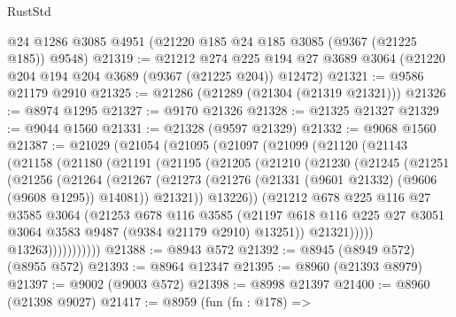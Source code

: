\begin{lexlean}{RustStd}
\begin{coremodule}
    @24
    @1286
    @3085
    @4951
    (@21220 @185 @24 @185 @3085 (@9367 (@21225 @185)) @9548)
@21319 := @21212
    @274
    @225
    @194
    @27
    @3689
    @3064
    (@21220 @204 @194 @204 @3689 (@9367 (@21225 @204)) @12472)
@21321 := @9586 @21179 @2910
@21325 := @21286 (@21289 (@21304 (@21319 @21321)))
@21326 := @8974 @1295
@21327 := @9170 @21326
@21328 := @21325 @21327
@21329 := @9044 @1560
@21331 := @21328 (@9597 @21329)
@21332 := @9068 @1560
@21387 := @21029
    (@21054
      (@21095
        (@21097
          (@21099
            (@21120
              (@21143
                (@21158
                  (@21180
                    (@21191
                      (@21195
                        (@21205
                          (@21210
                            (@21230
                              (@21245
                                (@21251
                                  (@21256
                                    (@21264
                                      (@21267
                                        (@21273
                                          (@21276
                                            (@21331 (@9601 @21332) (@9606 (@9608 @1295)) @14081))
                                          @21321))
                                      @13226))
                                  (@21212
                                    @678
                                    @225
                                    @116
                                    @27
                                    @3585
                                    @3064
                                    (@21253
                                      @678
                                      @116
                                      @3585
                                      (@21197
                                        @618
                                        @116
                                        @225
                                        @27
                                        @3051
                                        @3064
                                        @3583
                                        @9487
                                        (@9384 @21179 @2910)
                                        @13251))
                                    @21321)))))
                          @13263)))))))))))
@21388 := @8943 @572
@21392 := @8945 (@8949 @572) (@8955 @572)
@21393 := @8964 @12347
@21395 := @8960 (@21393 @8979)
@21397 := @9002 (@9003 @572)
@21398 := @8998 @21397
@21400 := @8960 (@21398 @9027)
@21417 := @8959
    (fun (fn : @178) =>

\end{coremodule}
\end{lexlean}
